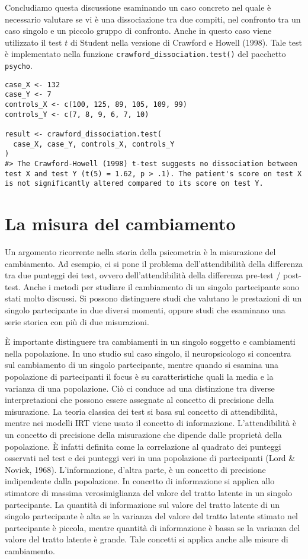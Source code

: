 \begin{exmp}
Concludiamo questa discussione esaminando un caso concreto nel quale è necessario valutare se vi è una dissociazione tra due compiti, nel confronto tra un caso singolo e un piccolo gruppo di confronto.
Anche in questo caso viene utilizzato il test $t$ di Student nella versione di Crawford e Howell (1998).
Tale test è implementato nella funzione \verb+crawford_dissociation.test()+ del pacchetto \verb+psycho+.
\begin{lstlisting}
case_X <- 132
case_Y <- 7
controls_X <- c(100, 125, 89, 105, 109, 99)
controls_Y <- c(7, 8, 9, 6, 7, 10)

result <- crawford_dissociation.test(
  case_X, case_Y, controls_X, controls_Y
)
#> The Crawford-Howell (1998) t-test suggests no dissociation between test X and test Y (t(5) = 1.62, p > .1). The patient's score on test X is not significantly altered compared to its score on test Y.
\end{lstlisting}
\end{exmp}


\section{La misura del cambiamento}

Un argomento ricorrente nella storia della psicometria è la misurazione del cambiamento. 
Ad esempio, ci si pone il problema dell'attendibilità della differenza tra due punteggi dei test, ovvero dell'attendibilità della differenza pre-test / post-test. 
Anche i metodi per studiare il cambiamento di un singolo partecipante sono stati molto discussi.
Si possono distinguere studi che valutano le prestazioni di un singolo partecipante in due diversi momenti, oppure studi che esaminano una serie storica con più di due misurazioni.

È importante distinguere tra cambiamenti in un singolo soggetto e cambiamenti nella popolazione.
In uno studio sul caso singolo, il neuropsicologo si concentra sul cambiamento di un singolo partecipante, mentre quando si esamina una popolazione di partecipanti il focus è su caratteristiche quali la media e la varianza di una popolazione.
Ciò ci conduce ad una distinzione tra diverse interpretazioni che possono essere assegnate al concetto di precisione della misurazione.
La teoria classica dei test si basa sul concetto di attendibilità, mentre nei modelli IRT viene usato il concetto di informazione. 
L'attendibilità è un concetto di precisione della misurazione che dipende dalle proprietà della popolazione. 
È infatti definita come la correlazione al quadrato dei punteggi osservati nel test e dei punteggi veri in una popolazione di partecipanti (Lord \& Novick, 1968). 
L'informazione, d'altra parte, è un concetto di precisione indipendente dalla popolazione. 
In concetto di informazione si applica allo stimatore di massima verosimiglianza del valore del tratto latente in un singolo partecipante.
La quantità di informazione sul valore del tratto latente di un singolo partecipante è alta se la varianza del valore del tratto latente stimato nel partecipante è piccola, mentre quantità di informazione è bassa se la varianza del valore del tratto latente è grande. 
Tale concetti si applica anche alle misure di cambiamento.

